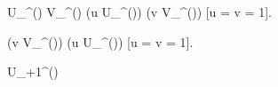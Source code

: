 \quad U_{\alpha}^{()} \subseteq V_{\alpha}^{()} (\forall u \in U_{\alpha}^{()}) (\exists v \in V_{\alpha}^{()}) [\llbracket u = v \rrbracket = 1].

\quad (\forall v \in V_{\alpha}^{()}) (\exists u \in U_{\alpha}^{()}) [\llbracket u = v \rrbracket = 1].

\quad U_{\alpha+1}^{()}
